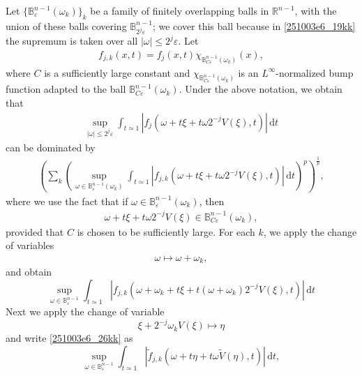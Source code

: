 \documentclass{article}
\numberwithin{equation}{section}
\theoremstyle{plain}
\begin{document}
	 Let $\{\mathbb{B}^{n-1}_\varepsilon(\omega_k)\}_k$ be a family of finitely overlapping balls in $\mathbb{R}^{n-1}$, with the union of these balls covering $\mathbb{B}^{n-1}_{2^j\varepsilon}$; we cover this ball because in \eqref{251003e6_19kk} the supremum is taken over all $|\omega|\le 2^j\varepsilon$.  Let 
    \begin{align}
        f_{j,k}(x,t)= f_j(x,t) \chi_{\mathbb{B}^{n-1}_{C\varepsilon}(\omega_k)}(x),
    \end{align}
    where $C$ is a sufficiently large constant and $\chi_{\mathbb{B}^{n-1}_{C\varepsilon}(\omega_k)}$ is an $L^{\infty}$-normalized bump function adapted to the ball $\mathbb{B}^{n-1}_{C\varepsilon}(\omega_k)$. Under the above notation, we obtain that 
    \begin{align}
        \sup_{|\omega|\le 2^j\varepsilon} \int_{t\simeq 1} |f_j(\omega+ t\xi+ t\omega 2^{-j} V(\xi), t)| \,\text{d}t 
    \end{align}
    can be dominated by
	\begin{align}\label{251003e6_23kk}
		 \left( \sum_k \left( \sup_{\omega\in \mathbb{B}^{n-1}_\varepsilon(\omega_k)} \int_{t\simeq 1} |f_{j,k}(\omega+ t\xi+ t\omega 2^{-j} V(\xi), t)| \,\text{d}t \right)^p  \right)^{\frac1p},
	\end{align}
	where we use the fact that if $\omega\in \mathbb{B}^{n-1}_\varepsilon(\omega_k)$, then
    \begin{align}
        \omega+ t\xi+ t\omega 2^{-j} V(\xi)\in \mathbb{B}^{n-1}_{C\varepsilon}(\omega_k),
    \end{align}
provided that $C$ is chosen to be sufficiently large. 
	For each $k$, we apply the change of variables
    \begin{align}
        \omega\mapsto \omega+ \omega_k,
    \end{align}
 and obtain 
 \begin{equation}\label{251003e6_26kk}
 \sup_{\omega\in \mathbb{B}^{n-1}_\varepsilon} \int_{t\simeq 1} |f_{j,k}(\omega+\omega_k+ t\xi+ t(\omega+ \omega_k) 2^{-j} V(\xi), t)| \,\text{d}t
 \end{equation}
Next we apply the change of variable   
   \begin{equation}
   \xi+ 2^{-j}\omega_k V(\xi)\mapsto \eta
   \end{equation}
and write \eqref{251003e6_26kk} as 
     \begin{equation}\label{251003e6_28kk}
 \sup_{\omega\in \mathbb{B}^{n-1}_\varepsilon} \int_{t\simeq 1} |\widetilde{f}_{j,k}(\omega+ t\eta
 + t\omega \widetilde{V}(\eta), t)| \,\text{d}t,
 \end{equation}
\end{document}
